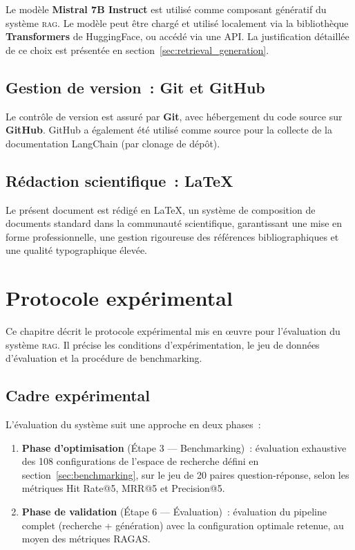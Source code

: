 \documentclass[12pt,a4paper,oneside]{report}
\newcommand{\rag}{\textsc{rag}}
\begin{document}
Le modèle \textbf{Mistral 7B Instruct} \citep{jiang2023mistral} est utilisé comme composant génératif du système \rag{}. Le modèle peut être chargé et utilisé localement via la bibliothèque \textbf{Transformers} de HuggingFace, ou accédé via une API. La justification détaillée de ce choix est présentée en section~\ref{sec:retrieval_generation}.

\section{Gestion de version~: Git et GitHub}

Le contrôle de version est assuré par \textbf{Git}, avec hébergement du code source sur \textbf{GitHub}. GitHub a également été utilisé comme source pour la collecte de la documentation LangChain (par clonage de dépôt).

\section{Rédaction scientifique~: \LaTeX{}}

Le présent document est rédigé en \LaTeX{}, un système de composition de documents standard dans la communauté scientifique, garantissant une mise en forme professionnelle, une gestion rigoureuse des références bibliographiques et une qualité typographique élevée.


\chapter{Protocole expérimental}
\label{chap:protocole}

Ce chapitre décrit le protocole expérimental mis en \oe{}uvre pour l'évaluation du système \rag{}. Il précise les conditions d'expérimentation, le jeu de données d'évaluation et la procédure de benchmarking.

\section{Cadre expérimental}

L'évaluation du système suit une approche en deux phases~:
\begin{enumerate}
  \item \textbf{Phase d'optimisation} (Étape 3 --- Benchmarking)~: évaluation exhaustive des 108 configurations de l'espace de recherche défini en section~\ref{sec:benchmarking}, sur le jeu de 20 paires question-réponse, selon les métriques Hit Rate@5, MRR@5 et Precision@5.
  \item \textbf{Phase de validation} (Étape 6 --- Évaluation)~: évaluation du pipeline complet (recherche + génération) avec la configuration optimale retenue, au moyen des métriques RAGAS.
\end{enumerate}
\end{document}
